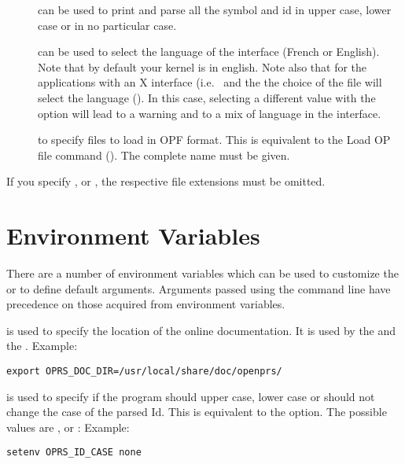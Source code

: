 \begin{description}
\item[] can be used to print and parse all the symbol
and id in upper case, lower case or in no particular case.

\item[] can be used to select the language of the interface
(French or English). Note that by default your kernel is in english. Note also
that for the applications with an X interface (i.e.\ \XPK{} and the \OPE{} the
choice of the  file will select the language
(). In this case, selecting a
different value with the option will lead to a warning and to a mix of language
in the interface.

\item[] to specify files to load in OPF format. This is
equivalent to the Load OP file command (). The
complete name must be given.

\end{description}

If you specify ,  or , the respective file
extensions must be omitted.


\section{\OPE{} Environment Variables}

There are a number of environment variables which can be used to customize the
\OPE{} or to define default arguments. Arguments passed using the command line
have precedence on those acquired from environment variables.

\begin{description}

\item[\code{OPRS\_DOC\_DIR}] is used  to specify the location of the online \COPRSDE{}
documentation. It is used by the \XPK{} and the \OPE{}.
Example:
\begin{verbatim}
export OPRS_DOC_DIR=/usr/local/share/doc/openprs/
\end{verbatim}

\item[\code{OPRS\_ID\_CASE}] is used to specify if the program should upper case,
lower case or should not change the case of the parsed Id. This is equivalent
to the  option. The possible values
are ,  or :\*
Example:
\begin{verbatim}
setenv OPRS_ID_CASE none
\end{verbatim}

\end{description}

